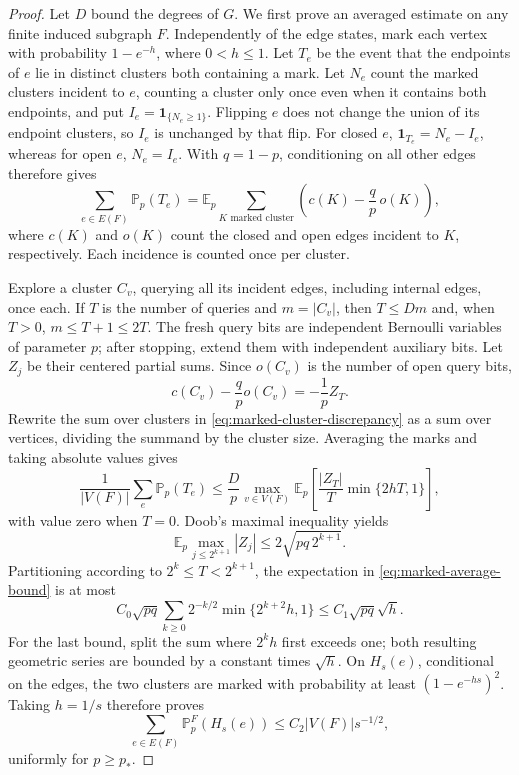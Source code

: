 \documentclass[11pt]{article}
\theoremstyle{definition}
\begin{document}
\begin{proof}
Let $D$ bound the degrees of $G$. We first prove an averaged estimate
on any finite induced subgraph $F$. Independently of the edge states,
mark each vertex with probability $1-e^{-h}$, where $0<h\le1$.
Let $T_e$ be the event that the endpoints of $e$ lie in distinct clusters
both containing a mark. Let $N_e$ count the marked clusters incident
to $e$, counting a cluster only once even when it contains both endpoints,
and put $I_e=\mathbf1_{\{N_e\ge1\}}$. Flipping $e$ does not change the
union of its endpoint clusters, so $I_e$ is unchanged by that flip.
For closed $e$, $\mathbf1_{T_e}=N_e-I_e$, whereas for open $e$,
$N_e=I_e$. With $q=1-p$, conditioning on all other edges therefore gives
\begin{equation}\label{eq:marked-cluster-discrepancy}
 \sum_{e\in E(F)}\mathbb P_p(T_e)
 =\mathbb E_p\sum_{K\text{ marked cluster}}
 \left(c(K)-\frac qp\,o(K)\right),
\end{equation}
where $c(K)$ and $o(K)$ count the closed and open edges incident to $K$,
respectively. Each incidence is counted once per cluster.

Explore a cluster $C_v$, querying all its incident edges, including
internal edges, once each. If $T$ is the number of queries and
$m=|C_v|$, then $T\le Dm$ and, when $T>0$, $m\le T+1\le2T$.
The fresh query bits are independent Bernoulli variables of parameter
$p$; after stopping, extend them with independent auxiliary bits.
Let $Z_j$ be their centered partial sums. Since
$o(C_v)$ is the number of open query bits,
\[
 c(C_v)-\frac qp o(C_v)=-\frac1p Z_T.
\]
Rewrite the sum over clusters in
\eqref{eq:marked-cluster-discrepancy} as a sum over vertices, dividing
the summand by the cluster size. Averaging the marks and taking absolute
values gives
\begin{equation}\label{eq:marked-average-bound}
 \frac1{|V(F)|}\sum_e\mathbb P_p(T_e)
 \le\frac Dp\max_{v\in V(F)}
 \mathbb E_p\left[\frac{|Z_T|}{T}\min\{2hT,1\}\right],
\end{equation}
with value zero when $T=0$.
Doob's maximal inequality yields
\[
 \mathbb E_p\max_{j\le 2^{k+1}}|Z_j|
 \le2\sqrt{pq\,2^{k+1}}.
\]
Partitioning according to $2^k\le T<2^{k+1}$, the expectation in
\eqref{eq:marked-average-bound} is at most
\[
 C_0\sqrt{pq}\sum_{k\ge0}2^{-k/2}
                       \min\{2^{k+2}h,1\}
 \le C_1\sqrt{pq}\sqrt h.
\]
For the last bound, split the sum where $2^kh$ first exceeds one;
both resulting geometric series are bounded by a constant times
$\sqrt h$. On $H_s(e)$, conditional on the edges, the two clusters
are marked with probability at least $(1-e^{-hs})^2$. Taking $h=1/s$
therefore proves
\begin{equation}\label{eq:finite-two-cluster-average}
 \sum_{e\in E(F)}\mathbb P_p^F(H_s(e))
 \le C_2|V(F)|s^{-1/2},
\end{equation}
uniformly for $p\ge p_*$.


\end{proof}
\end{document}
